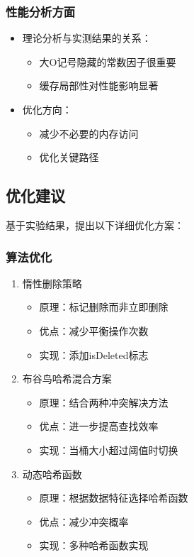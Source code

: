 \documentclass[12pt,a4paper]{article}
\begin{document}
\subsubsection{性能分析方面}
\begin{itemize}
\item 理论分析与实测结果的关系：
  \begin{itemize}
  \item 大O记号隐藏的常数因子很重要
  \item 缓存局部性对性能影响显著
  \end{itemize}
\item 优化方向：
  \begin{itemize}
  \item 减少不必要的内存访问
  \item 优化关键路径
  \end{itemize}
\end{itemize}

\subsection{优化建议}
基于实验结果，提出以下详细优化方案：

\subsubsection{算法优化}
\begin{enumerate}
\item 惰性删除策略
\begin{itemize}
\item 原理：标记删除而非立即删除
\item 优点：减少平衡操作次数
\item 实现：添加isDeleted标志
\end{itemize}

\item 布谷鸟哈希混合方案
\begin{itemize}
\item 原理：结合两种冲突解决方法
\item 优点：进一步提高查找效率
\item 实现：当桶大小超过阈值时切换
\end{itemize}

\item 动态哈希函数
\begin{itemize}
\item 原理：根据数据特征选择哈希函数
\item 优点：减少冲突概率
\item 实现：多种哈希函数实现
\end{itemize}
\end{enumerate}
\end{document}
